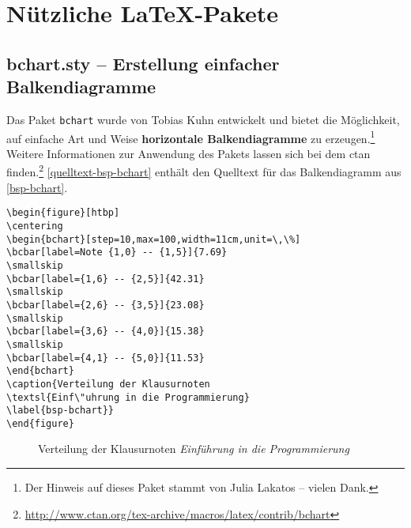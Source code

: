 \chapter{N\"utzliche \LaTeX-Pakete}

\section{bchart.sty -- Erstellung einfacher Balkendiagramme}

Das Paket \texttt{bchart} wurde von Tobias Kuhn entwickelt und bietet die M\"oglichkeit, auf einfache Art und Weise \textbf{horizontale Balkendiagramme}
zu erzeugen.\footnote{Der Hinweis auf dieses Paket stammt von Julia Lakatos -- vielen Dank.} Weitere Informationen 
zur Anwendung des Pakets lassen sich bei dem \gls{ctan} finden.\footnote{\url{http://www.ctan.org/tex-archive/macros/latex/contrib/bchart}}
\vref{quelltext-bsp-bchart} enth\"alt den Quelltext f\"ur das Balkendiagramm aus \vref{bsp-bchart}.

\begin{programm}[htbp]
\begin{lstlisting}[keywordstyle=\color{black},showstringspaces=false]
\begin{figure}[htbp]
\centering
\begin{bchart}[step=10,max=100,width=11cm,unit=\,\%]
\bcbar[label=Note {1,0} -- {1,5}]{7.69}
\smallskip
\bcbar[label={1,6} -- {2,5}]{42.31}
\smallskip
\bcbar[label={2,6} -- {3,5}]{23.08}
\smallskip
\bcbar[label={3,6} -- {4,0}]{15.38}
\smallskip
\bcbar[label={4,1} -- {5,0}]{11.53}
\end{bchart}
\caption{Verteilung der Klausurnoten 
\textsl{Einf\"uhrung in die Programmierung}
\label{bsp-bchart}}
\end{figure}
\end{lstlisting}
\caption{Quelltext zur Erzeugung des Balkendiagramms aus \vref{bsp-bchart}\label{quelltext-bsp-bchart}}
\end{programm}
\clearpage


\begin{figure}[htbp]
\centering
\begin{bchart}[step=10,max=100,width=11cm,unit=\,\%]
\smallskip
{}
\smallskip
{}
\smallskip
{}
\smallskip
{}
\end{bchart}
\caption{Verteilung der Klausurnoten 
\textsl{Einf\"uhrung in die Programmierung}
\label{bsp-bchart}}
\end{figure}


